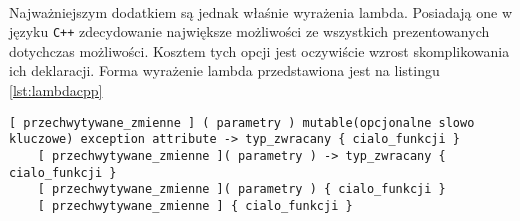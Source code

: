 \documentclass[a4paper,10pt]{report}
\begin{document}
 \paragraph{}
  Najważniejszym dodatkiem są jednak właśnie wyrażenia lambda. Posiadają one w języku \verb|C++| zdecydowanie największe możliwości ze wszystkich prezentowanych dotychczas możliwości. Kosztem tych opcji jest oczywiście wzrost skomplikowania ich deklaracji. Forma wyrażenie lambda przedstawiona jest na listingu \ref{lst:lambdacpp}
  \begin{lstlisting}[caption={Składania wyrażeń lambda w języku C++},label={lst:lambdacpp}]
	[ przechwytywane_zmienne ] ( parametry ) mutable(opcjonalne slowo kluczowe) exception attribute -> typ_zwracany { cialo_funkcji }	
	[ przechwytywane_zmienne ]( parametry ) -> typ_zwracany { cialo_funkcji }
	[ przechwytywane_zmienne ]( parametry ) { cialo_funkcji }
	[ przechwytywane_zmienne ] { cialo_funkcji }
  \end{lstlisting}
\end{document}
